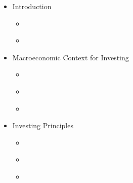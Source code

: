 \documentclass[letterpaper,10pt,english]{jupyterBook}
\begin{document}
\begin{itemize}
\item {} 
\sphinxAtStartPar
Introduction

\begin{itemize}
\item {} 
\sphinxAtStartPar
{\hyperref[\detokenize{ch/summary::doc}]{}}

\item {} 
\sphinxAtStartPar
{\hyperref[\detokenize{ch/references::doc}]{}}

\end{itemize}
\end{itemize}
\begin{itemize}
\item {} 
\sphinxAtStartPar
Macroeconomic Context for Investing

\begin{itemize}
\item {} 
\sphinxAtStartPar
{\hyperref[\detokenize{ch/actors::doc}]{}}

\item {} 
\sphinxAtStartPar
{\hyperref[\detokenize{ch/inflation::doc}]{}}

\item {} 
\sphinxAtStartPar
{\hyperref[\detokenize{ch/policy::doc}]{}}

\end{itemize}
\end{itemize}
\begin{itemize}
\item {} 
\sphinxAtStartPar
Investing Principles

\begin{itemize}
\item {} 
\sphinxAtStartPar
{\hyperref[\detokenize{ch/principles/intro_nb::doc}]{}}

\item {} 
\sphinxAtStartPar
{\hyperref[\detokenize{code/notebooks/rebalancing::doc}]{}}

\item {} 
\sphinxAtStartPar
{\hyperref[\detokenize{code/notebooks/sequence-risk::doc}]{}}

\end{itemize}
\end{itemize}
\end{document}
